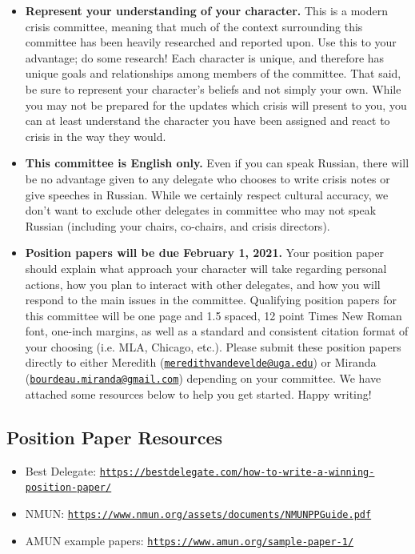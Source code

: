 \documentclass[10pt, letterpaper]{article}
\begin{document}
\begin{itemize}
\item
  \textbf{Represent your understanding of your character.} This is a
  modern crisis committee, meaning that much of the context surrounding
  this committee has been heavily researched and reported upon. Use this
  to your advantage; do some research! Each character is unique, and
  therefore has unique goals and relationships among members of the
  committee. That said, be sure to represent your character's beliefs
  and not simply your own. While you may not be prepared for the updates
  which crisis will present to you, you can at least understand the
  character you have been assigned and react to crisis in the way they
  would.


\item
  \textbf{This committee is English only.} Even if you can speak
  Russian, there will be no advantage given to any delegate who chooses
  to write crisis notes or give speeches in Russian. While we certainly
  respect cultural accuracy, we don't want to exclude other delegates in
  committee who may not speak Russian (including your chairs, co-chairs,
  and crisis directors).
 
\item
 
  \textbf{Position papers will be due February 1, 2021.}
  Your position paper should explain what approach your character will
  take regarding personal actions, how you plan to interact with other
  delegates, and how you will respond to the main issues in the
  committee. Qualifying position papers for this committee will be one
  page and 1.5 spaced, 12 point Times New Roman font, one-inch margins,
  as well as a standard and consistent citation format of your choosing
  (i.e. MLA, Chicago, etc.). Please submit these position papers
  directly to either Meredith
  (\texttt{\href{mailto:meredithvandevelde@uga.edu}{meredithvandevelde@uga.edu}})
  or Miranda
  (\texttt{\href{mailto:bourdeau.miranda@gmail.com}{bourdeau.miranda@gmail.com}})
  depending on your committee. We have attached some resources below to
  help you get started. Happy writing! \\
\end{itemize}

\subsection{Position Paper Resources}
\begin{itemize}
\item
Best Delegate:
\texttt{\href{https://bestdelegate.com/how-to-write-a-winning-position-paper/}{https://bestdelegate.com/how-to-write-a-winning-position-paper/}} 
\item
NMUN:
\texttt{\href{https://www.nmun.org/assets/documents/NMUNPPGuide.pdf}{https://www.nmun.org/assets/documents/NMUNPPGuide.pdf}} 
\item
AMUN example papers:
\texttt{\href{https://www.amun.org/sample-paper-1/}{https://www.amun.org/sample-paper-1/}} 
\end{itemize}
\end{document}
